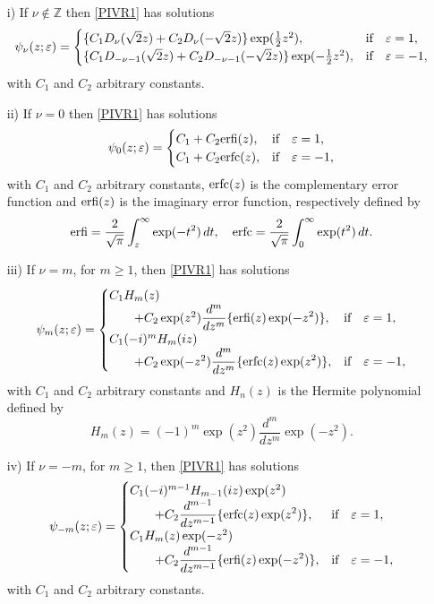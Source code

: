 \documentclass[12pt]{article}
\def\Z{\mathbb{Z}}
\numberwithin{figure}{section}
\numberwithin{equation}{section}
\numberwithin{table}{section}
\begin{document}
\begin{itemize}
\item[i)]
If $\nu\not\in\Z$ then \eqref{PIVR1} has solutions
$$
\psi_{\nu}(z;\varepsilon)=\begin{cases}
\{C_1D_\nu(\sqrt{2}z)+C_2D_\nu(-\sqrt{2}z)\}\exp(\tfrac{1}{2}z^2),&\mbox{\rm if}\quad \varepsilon=1,\\
\{C_1D_{-\nu-1}(\sqrt{2}z)+C_2D_{-\nu-1}(-\sqrt{2}z)\}\exp(-\tfrac{1}{2}z^2),&\mbox{\rm if}\quad \varepsilon=-1,
\end{cases}
$$
with $C_1$ and $C_2$ arbitrary constants.
\item[ii)]
If $\nu=0$ then \eqref{PIVR1} has solutions
$$
\psi_{0}(z;\varepsilon)=\begin{cases}
C_1+C_2{\rm{erfi}}(z),&\mbox{\rm if}\quad \varepsilon=1,\\
C_1+C_2{\rm{erfc}}(z),&\mbox{\rm if}\quad \varepsilon=-1,
\end{cases}
$$
with $C_1$ and $C_2$ arbitrary constants, ${\rm{erfc}}(z)$ is the complementary error function and ${\rm{erfi}}(z)$ is the imaginary error function, respectively defined by
\begin{equation}
{\rm{erfi}}=\frac{2}{\sqrt{\pi}}\int^\infty_z\exp(-t^2)\,dt,~~~{\rm{erfc}}=\frac{2}{\sqrt{\pi}}\int^\infty_0\exp(t^2)\,dt.
\end{equation}
\item[iii)]
If $\nu=m$, for $m\geq1$, then \eqref{PIVR1} has solutions
$$
\psi_{m}(z;\varepsilon)=\begin{cases}
C_1H_m(z)\\\qquad+C_2\exp(z^2)\displaystyle\frac{d^m}{dz^m}\{{\rm{erfi}}(z)\exp(-z^2)\},&\mbox{\rm if}\quad \varepsilon=1,\\
C_1(-i)^{m}H_m(iz)\\\qquad+C_2\exp(-z^2)\displaystyle\frac{d^m}{dz^m}\{{\rm{erfc}}(z)\exp(z^2)\},&\mbox{\rm if}\quad \varepsilon=-1,\\
\end{cases}
$$
with $C_1$ and $C_2$ arbitrary constants and $H_n(z)$ is the Hermite polynomial defined by
\begin{equation}
H_m(z)=(-1)^m\exp(z^2)\frac{d^m}{dz^m}\exp(-z^2).
\end{equation}
\item[iv)]
If $\nu=-m$, for $m\geq1$, then \eqref{PIVR1} has solutions
$$
\psi_{-m}(z;\varepsilon)=\begin{cases}
C_1(-i)^{m-1}H_{m-1}(iz)\exp(z^2)\\\qquad+C_2\displaystyle\frac{d^{m-1}}{dz^{m-1}}\{{\rm{erfc}}(z)\exp(z^2)\},&\mbox{\rm if}\quad \varepsilon=1,\\
C_1H_m(z)\exp(-z^2)\\\qquad+C_2\displaystyle\frac{d^{m-1}}{dz^{m-1}}\{{\rm{erfi}}(z)\exp(-z^2)\},&\mbox{\rm if}\quad \varepsilon=-1,\\
\end{cases}
$$
with $C_1$ and $C_2$ arbitrary constants.
\end{itemize}
\end{document}
